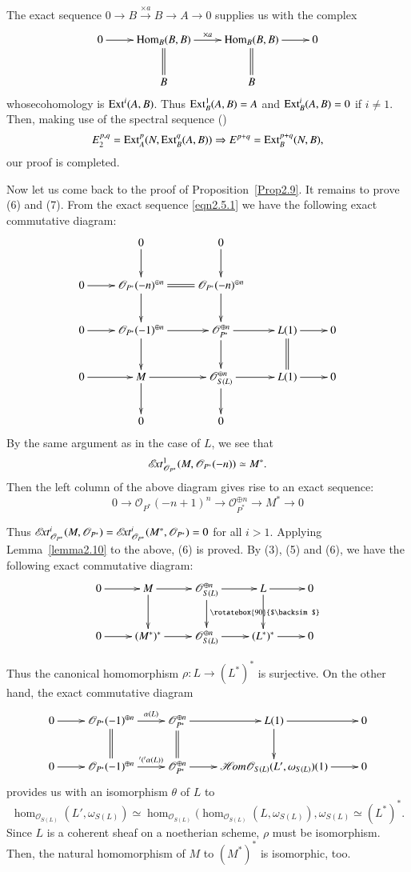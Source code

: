 \begin{Proof}
The exact sequence $0\to B\xrightarrow{\times a} B \to A\to 0$
supplies us with the complex 
$$
\xymatrix{0\ar[r]& \Hom_{B}(B,B) \ar@{=}[d]\ar[r]^{\times
    a}&\Hom_{B}(B,B)\ar@{=}[d]\ar[r]&0\\
& B & B &}
$$
whose\pageoriginale cohomology is $\operatorname{Ext}^{i}(A,B)$. Thus
$\operatorname{Ext}^{1}_{B}(A,B)=A$ and $\operatorname{Ext}^{i}_B(A,B)=0$ if $i\neq 1$. Then,
making use of the spectral sequence (\cite[p.~349]{key5})
$$
E^{p,q}_2=\operatorname{Ext}^{p}_A(N,\operatorname{Ext}^{q}_B(A,B))\Rightarrow E^{p+q}=\operatorname{Ext}^{p+q}_{B}(N,B),
$$
our proof is completed.

Now let us come back to the proof of Proposition~\ref{Prop2.9}. It
remains to prove (6) and (7). From the exact sequence \eqref{eqn2.5.1}
we have the following exact commutative diagram: 
$$
\xymatrix{& 0\ar[d]&0\ar[d]&\\
0 \ar[r] &\mathscr{O}_{P^{\ast}}(-n)^{\oplus n}\ar@{=}[r]\ar[d]&\mathscr{O}_{P^{\ast}}(-n)^{\oplus n}\ar[d]& \\
0\ar[r]&\mathscr{O}_{P^{\ast}}(-1)^{\oplus
    n}\ar[r]\ar[d]&\mathscr{O}_{P^{\ast}}^{\oplus
    n}\ar[r]\ar[d]&L(1)\ar[r]\ar@{=}[d]&0\\
0\ar[r]&M\ar[r]\ar[d]&\mathscr{O}_{S(L)}^{\oplus n}\ar[r]\ar[d]&L(1)\ar[r]&0\\
& 0 & 0 &}
$$
By the same argument as in the case of $L$, we see that
$$
\mathscr{E}\!{\it xt}^{1}_{\mathscr{O}_{P^{\ast}}}(M,\mathscr{O}_{P^{\ast}}(-n))\simeq
M^{\ast}.
$$ 
Then the left column of the above diagram gives rise to an
exact sequence: 
$$
0\to \mathscr{O}_{P^{\ast}}(-n+1)^{n}\to \mathscr{O}^{\oplus
  n}_{P^{\ast}}\to M^{\ast}\to 0
$$

Thus\pageoriginale
$\mathscr{E}\!{\it xt}^{i}_{\mathscr{O}_{P^{\ast}}}(M,\mathscr{O}_{P^{\ast}})=\mathscr{E}\!{\it xt}^{i}_{\mathscr{O}_{P^{\ast}}}(M^{\ast},\mathscr{O}_{P^{\ast}})=0$
for all $i>1$. Applying Lemma~\ref{lemma2.10} to the above, (6) is
proved. By (3), (5) and (6), we have the following exact commutative
diagram:
$$
\xymatrix{0\ar[r]&M\ar[r]\ar[d]&\mathscr{O}_{S(L)}^{\oplus
    n}\ar[r]\ar[d]^{\text{\rotatebox{90}{$\backsim$}}}&L\ar[r]\ar[d]&0\\
0\ar[r]&(M^{\ast})^{\ast}\ar[r]&\mathscr{O}_{S(L)}^{\oplus n}\ar[r]&(L^{\ast})^{\ast}\ar[r]&0}
$$

Thus the canonical homomorphism $\rho:L\to (L^{\ast})^{\ast}$ is
surjective. On the other hand, the exact commutative diagram 
$$
\xymatrix{0\ar[r]&\mathscr{O}_{P^{\ast}}(-1)^{\oplus
    n}\ar@{=}[d]\ar[r]^-{\alpha(L)}&\mathscr{O}_{P^{\ast}}^{\oplus
    n}\ar@{=}[d]\ar[r]&L(1)\ar[d]\ar[r] &0\\
0\ar[r]&\mathscr{O}_{P^{\ast}}(-1)^{\oplus
    n}\ar[r]^-{{}^t({}^t\alpha(L))}&\mathscr{O}_{P^{\ast}}^{\oplus
    n}\ar[r]&\hom\mathscr{O}_{S(L)}(L',\omega_{S(L)})(1)\ar[r]&0}
$$
provides us with an isomorphism $\theta$ of $L$ to
$$
\hom_{\mathscr{O}_{S(L)}}(L',\omega_{S(L)})\simeq
\hom_{\mathscr{O}_{S(L)}}(\hom_{\mathscr{O}_{S(L)}}(L,\omega_{S(L)}),
\omega_{S(L)}\simeq (L^{\ast})^{\ast}.
$$ 
Since $L$ is a coherent sheaf
on a noetherian scheme, $\rho$ must be isomorphism. Then, the natural
homomorphism of $M$ to $(M^{\ast})^{\ast}$ is isomorphic, too. 
\enprf
\end{Proof}

